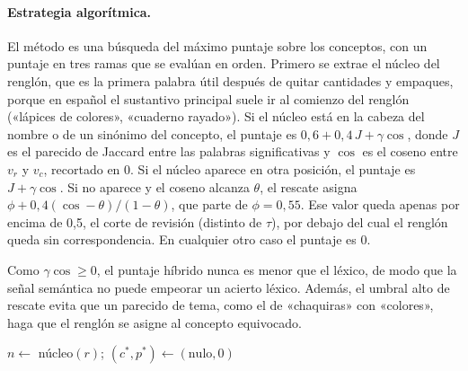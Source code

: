 \paragraph{Estrategia algorítmica.} El método es una búsqueda del máximo puntaje sobre los
conceptos, con un puntaje en tres ramas que se evalúan en orden. Primero se extrae el núcleo del
renglón, que es la primera palabra útil después de quitar cantidades y empaques, porque en español
el sustantivo principal suele ir al comienzo del renglón («lápices de colores», «cuaderno rayado»). Si el núcleo está en la cabeza del nombre o de un sinónimo del
concepto, el puntaje es $0{,}6+0{,}4\,J+\gamma\cos$, donde $J$ es el parecido de Jaccard entre las
palabras significativas y $\cos$ es el coseno entre $v_r$ y $v_c$, recortado en 0. Si el núcleo
aparece en otra posición, el puntaje es $J+\gamma\cos$. Si no aparece y el coseno alcanza $\theta$, el
rescate asigna $\phi+0{,}4(\cos-\theta)/(1-\theta)$, que parte de $\phi=0{,}55$. Ese valor queda apenas por encima de 0,5, el corte de revisión (distinto de $\tau$), por debajo del cual el
renglón queda sin correspondencia. En cualquier otro caso el puntaje es 0.

Como $\gamma\cos\ge 0$, el puntaje híbrido nunca es
menor que el léxico, de modo que la señal semántica no puede empeorar un acierto léxico. Además, el
umbral alto de rescate evita que un parecido de tema, como el de «chaquiras» con «colores», haga que
el renglón se asigne al concepto equivocado.

\begin{algorithm}[!htb]
\caption{Resolución de un renglón contra el catálogo de conceptos}
\label{alg:resolucion}
$n \leftarrow$ núcleo$(r)$; $(c^*, p^*) \leftarrow (\text{nulo}, 0)$\;
\;
\end{algorithm}

